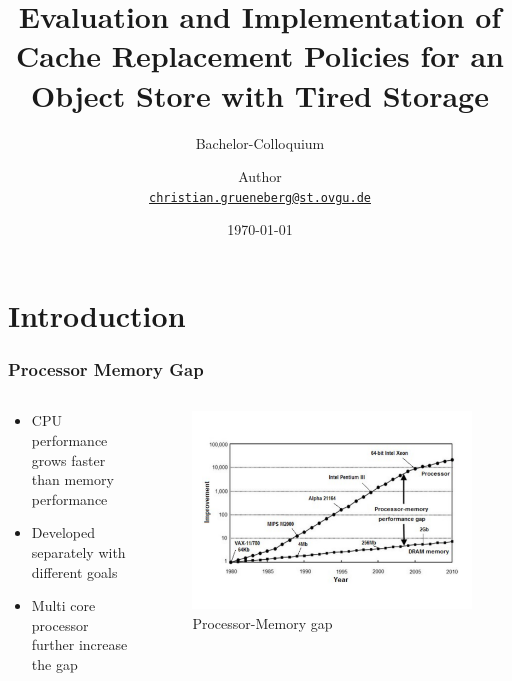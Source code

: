\documentclass[
	aspectratio=169,
	compress,
]{beamer}
\title{Evaluation and Implementation of \\Cache Replacement Policies for an \\Object Store with Tired Storage}
\subtitle{Bachelor-Colloquium}
\author[Author]{
Author\\
{\footnotesize\href{mailto:christian.grueneberg@st.ovgu.de}{\nolinkurl{christian.grueneberg@st.ovgu.de}}}
}
\date{\today}
\institute{
Faculty of Computer Science\\
Otto von Guericke University Magdeburg
}
\newcommand{\navframetitle}[1]{\frametitle{#1\hfill{\footnotesize\lastsection{}}}}
\begin{document}
\maketitle

\section{Introduction}
\label{sec:introduction}

\begin{frame}
	\navframetitle{Processor Memory Gap}

	\begin{columns}
		\begin{column}{0.5\textwidth}
			\begin{itemize}
				\item CPU performance grows faster than memory performance
				\item Developed separately with different goals
				\item Multi core processor further increase the gap 
			\end{itemize}
		\end{column}
		\begin{column}{0.5\textwidth}
			\begin{figure}[ht]
    			\centering
    			\includegraphics[scale=0.2]{processor_memory_gap.pdf}
    			\caption{Processor-Memory gap \cite{cpu-mem-gap}}
        		\label{fig:processor memory gap}
			\end{figure}
		\end{column}
	\end{columns}
\end{frame}
\end{document}
